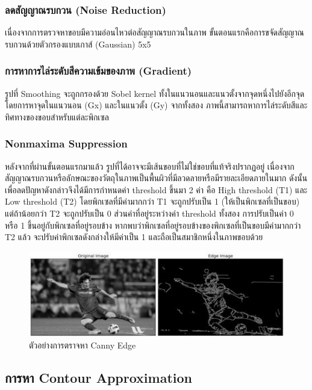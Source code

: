 		\subsubsection{ลดสัญญาณรบกวน (Noise Reduction)} 
		เนื่องจากการตรวจหาขอบมีความอ่อนไหวต่อสัญญาณรบกวนในภาพ ขั้นตอนแรกคือการขจัดสัญญาณรบกวนด้วยตัวกรองแบบเกาส์ (Gaussian) 5x5 
		\subsubsection{การหาการไล่ระดับสีความเข้มของภาพ (Gradient)}
		รูปที่ Smoothing จะถูกกรองด้วย Sobel kernel ทั้งในแนวนอนและแนวตั้งจากจุดหนึ่งไปยังอีกจุด โดยการหาจุดในแนวนอน (Gx) และในแนวตั้ง (Gy) จากทั้งสอง ภาพนี้สามารถหาการไล่ระดับสีและทิศทางของขอบสำหรับแต่ละพิกเซล
		\subsubsection{Nonmaxima Suppression}
		หลังจากที่ผ่านขั้นตอนแรกมาแล้ว รูปที่ได้อาจจะมีเส้นขอบที่ไม่ใช่ขอบที่แท้จริงปรากฏอยู่ เนื่องจากสัญญาณรบกวนหรือลักษณะของวัตถุในภาพเป็นพื้นผิวที่มีลวดลายหรือมีรายละเอียดภายในมาก ดังนั้นเพื่อลดปัญหาดังกล่าวจึงได้มีการกำหนดค่า threshold ขึ้นมา 2 ค่า คือ High threshold (T1) และ Low threshold (T2) โดยพิกเซลที่มีค่ามากกว่า T1 จะถูกปรับเป็น 1 (ให้เป็นพิกเซลที่เป็นขอบ) แต่ถ้าน้อยกว่า T2 จะถูกปรับเป็น 0 ส่วนค่าที่อยู่ระหว่างค่า threshold ทั้งสอง การปรับเป็นค่า 0 หรือ 1 ขึ้นอยู่กับพิกเซลที่อยู่รอบข้าง หากพบว่าพิกเซลที่อยู่รอบข้างของพิกเซลที่เป็นขอบมีค่ามากกว่า T2 แล้ว จะปรับค่าพิกเซลดังกล่างให้มีค่าเป็น 1 และถือเป็นสมาชิกหนึ่งในภาพขอบด้วย
		\begin{figure}[H]
			\includegraphics[width=\columnwidth]{Figures/2/canny-edge-detected}
			\caption{ตัวอย่างการตราจหา Canny Edge}
			\label{Fig:canny-edge-detected}
		\end{figure}


	\subsection{การหา Contour Approximation}
		\vspace{-5mm}

